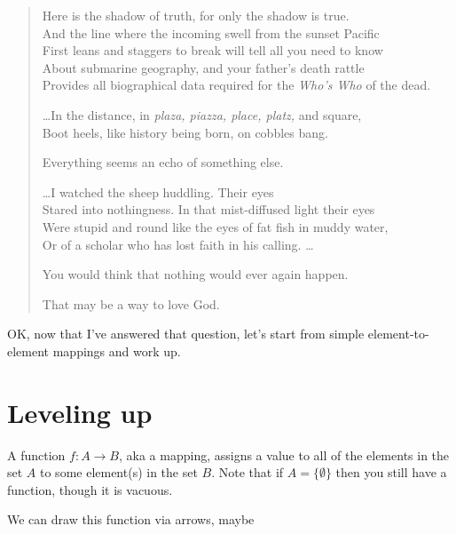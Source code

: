 \documentclass[11pt]{article}
\begin{document}
\begin{verse}
Here is the shadow of truth, for only the shadow is true.\\
And the line where the incoming swell from the sunset Pacific\\
First leans and staggers to break will tell all you need to know\\
About submarine geography, and your father's death rattle\\
Provides all biographical data required for the {\em Who's Who} of the dead.

\dots In the distance, in {\em plaza, piazza, place, platz,} and square,\\
Boot heels, like history being born, on cobbles bang.

Everything seems an echo of something else.

\dots I watched the sheep huddling.  Their eyes\\
Stared into nothingness.  In that mist-diffused light their eyes\\
Were stupid and round like the eyes of fat fish in muddy water,\\
Or of a scholar who has lost faith in his calling. \dots

You would think that nothing would ever again happen.

That may be a way to love God.
\end{verse}

OK, now that I've answered that question, let's start from simple element-to-element
mappings and work up.

\section{Leveling up}\label{levelsec}

A function $f:A\to B$, aka a mapping, assigns a value to all of the elements in the set $A$ to
some element(s) in the set $B$. Note that if $A=\{\emptyset\}$ then you still have a function, though
it is vacuous.

We can draw this function via arrows, maybe

\begin{center}
\end{center}
\end{document}
